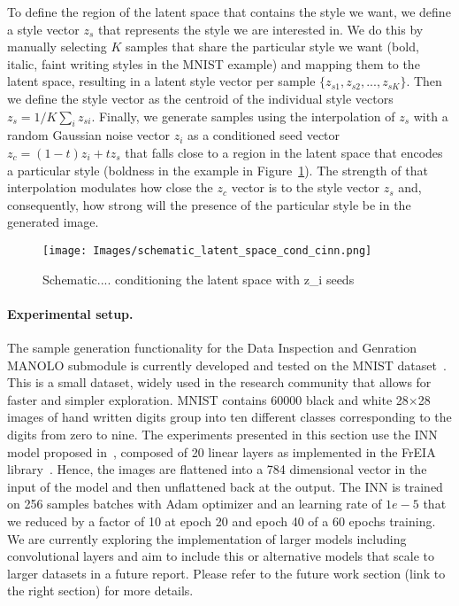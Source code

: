             To define the region of the latent space that contains the style we want, we define a style vector $z_s$ that represents the style we are interested in. We do this by manually selecting $K$ samples that share the particular style we want (bold, italic, faint writing styles in the MNIST example) and mapping them to the latent space, resulting in a latent style vector per sample $\{z_{s1}, z_{s2}, ..., z_{sK}\}$. Then we define the style vector as the centroid of the individual style vectors $z_{s} = 1/K \sum_{i} z_{si}$. Finally, we generate samples using the interpolation of $z_{s}$ with a random Gaussian noise vector $z_i$ as a conditioned seed vector $z_c = (1-t) z_i + t z_{s}$ that falls close to a region in the latent space that encodes a particular style (boldness in the example in Figure~\ref{fig:ciinn_latent_conditioning}). The strength of that interpolation modulates how close the $z_c$ vector is to the style vector $z_s$ and, consequently, how strong will the presence of the particular style be in the generated image.
            
            \begin{figure}
                \vskip -0.2in 
                \centering
    
                \texttt{[image: Images/schematic\_latent\_space\_cond\_cinn.png]} 
                
                \vspace{-2pt}
                \caption{\label{fig:ciinn_latent_conditioning} Schematic.... conditioning the latent space with z\_i seeds}
                \vskip -0.0in 
            \end{figure}
    
            \paragraph{Experimental setup.} 
            The sample generation functionality for the Data Inspection and Genration MANOLO submodule is currently developed and tested on the MNIST dataset~\cite{1998_IEEE_MNIST}. This is a small dataset, widely used in the research community that allows for faster and simpler exploration. MNIST contains 60000 black and white 28$\times$28 images of hand written digits group into ten different classes corresponding to the digits from zero to nine. The experiments presented in this section use the INN model  proposed in~\cite{2019_arxiv_cinn}, composed of 20 linear layers as implemented in the FrEIA library~\cite{freia}. Hence, the images are flattened into a 784 dimensional vector in the input of the model and then unflattened back at the output. The INN is trained on 256 samples batches with Adam optimizer and an learning rate of $1e-5$ that we reduced by a factor of 10 at epoch 20 and epoch 40 of a 60 epochs training. We are currently exploring the implementation of larger models including convolutional layers and aim to include this or alternative models that scale to larger datasets in a future report. Please refer to the future work section (link to the right section) for more details.

